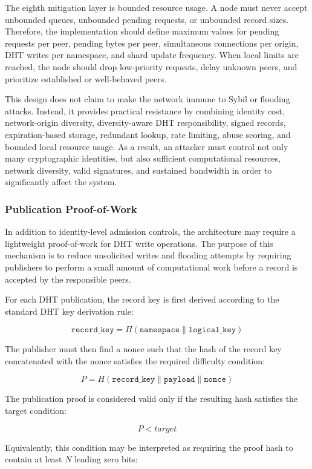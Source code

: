 \documentclass[12pt,a4paper]{article}
\begin{document}
The eighth mitigation layer is bounded resource usage. A node must never accept
unbounded queues, unbounded pending requests, or unbounded record sizes. Therefore,
the implementation should define maximum values for pending requests per peer,
pending bytes per peer, simultaneous connections per origin, DHT writes per
namespace, and shard update frequency. When local limits are reached, the node
should drop low-priority requests, delay unknown peers, and prioritize established
or well-behaved peers.

This design does not claim to make the network immune to Sybil or flooding attacks.
Instead, it provides practical resistance by combining identity cost, network-origin
diversity, diversity-aware DHT responsibility, signed records, expiration-based
storage, redundant lookup, rate limiting, abuse scoring, and bounded local resource
usage. As a result, an attacker must control not only many cryptographic identities,
but also sufficient computational resources, network diversity, valid signatures,
and sustained bandwidth in order to significantly affect the system.

\subsubsection{Publication Proof-of-Work}

In addition to identity-level admission controls, the architecture may require a
lightweight proof-of-work for DHT write operations. The purpose of this mechanism
is to reduce unsolicited writes and flooding attempts by requiring publishers to
perform a small amount of computational work before a record is accepted by the
responsible peers.

For each DHT publication, the record key is first derived according to the standard
DHT key derivation rule:

\[
\texttt{record\_key} = H(\texttt{namespace} \parallel \texttt{logical\_key})
\]

The publisher must then find a nonce such that the hash of the record key
concatenated with the nonce satisfies the required difficulty condition:

\[
P = H(\texttt{record\_key} \parallel \texttt{payload} \parallel \texttt{nonce})
\]

The publication proof is considered valid only if the resulting hash satisfies the
target condition:

\[
P < target
\]

Equivalently, this condition may be interpreted as requiring the proof hash to
contain at least \(N\) leading zero bits:
\end{document}
